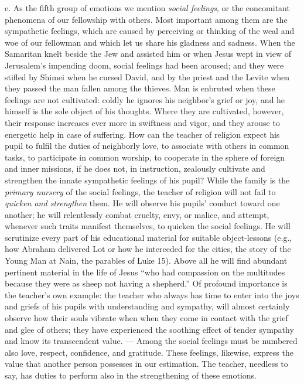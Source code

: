 e. As the fifth group of emotions we mention \emph{social feelings}, or the concomitant phenomena of our fellowship with others. Most important among them are the sympathetic feelings, which are caused by perceiving or thinking of the weal and woe of our fellowman and which let us share his gladness and sadness. When the Samaritan knelt beside the Jew and assisted him or when Jesus wept in view of Jerusalem’s impending doom, social feelings had been aroused; and they were stifled by Shimei when he cursed David, and by the priest and the Levite when they passed
the man fallen among the thieves. Man is enbruted when these feelings are not cultivated: coldly he ignores his neighbor’s grief or joy, and he himself is the sole object of his thoughts. Where they are cultivated, however, their response increases ever more in swiftness and vigor, and they arouse to energetic help in case of suffering. How can the teacher of religion expect his pupil to fulfil the duties of neighborly love, to associate with others in common tasks, to participate in common worship, to cooperate in the sphere of foreign and inner missions, if he does not, in instruction, zealously cultivate and strengthen the innate sympathetic feelings of his pupil? While the family is the \emph{primary nursery} of the social feelings, the teacher of religion will not fail to \emph{quicken and strengthen} them. He will observe his pupils’ conduct toward one another; he will relentlessly combat cruelty, envy, or malice, and attempt, whenever such traits manifest themselves, to quicken the social feelings. He will scrutinize every part of his educational material for suitable object-lessons (e.g., how Abraham delivered Lot or how he interceded for the cities, the story of the Young Man at Nain, the parables of Luke 15). Above all he will find abundant pertinent material in the life of Jesus “who had compassion on the multitudes because they were as sheep not having a shepherd.” Of profound importance is the teacher’s own example: the teacher who always has time to enter into the joys and griefs of his pupils with understanding and sympathy, will almost certainly observe how their souls vibrate when when they come in contact with the grief and glee of others; they have experienced the soothing effect of tender sympathy and know its transcendent value. — Among the social feelings must be numbered also love, respect, confidence, and gratitude. These feelings, likewise, express the value that another person possesses in our estimation. The teacher, needless to say, has duties to perform also in the strengthening of these emotions.

